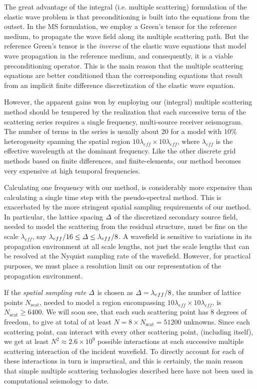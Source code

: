 The great advantage of the integral (i.e. 
multiple scattering) formulation  of the elastic wave problem is that 
preconditioning is built into the equations from the outset. In the MS 
formulation, we employ a Green's tensor for the reference medium, to 
propagate the wave field along its multiple scattering path. But the 
reference Green's tensor is the {\em inverse\/} of  the elastic wave 
equations that model wave propagation in the reference medium, and 
consequently, it is a viable preconditioning operator. This is the main 
reason that the multiple scattering equations are better conditioned than 
the corresponding equations that result from an implicit finite 
difference discretization of the elastic wave equation.



However, the apparent   gains won by employing our (integral)  multiple scattering 
method should be tempered by the 
realization that  each 
successive term of the scattering series requires a single frequency, multi-source receiver 
seismogram. The number of terms in the series is usually about $20$ for a 
model with $10\%$ heterogeneity spanning the spatial region $10 \lambda_{eff} \times  10 
\lambda_{eff}$, where $\lambda_{eff}$ is the effective wavelength at the 
dominant frequency. Like the other discrete grid methods based on finite 
differences, and finite-elements, our method becomes very expensive at 
high temporal frequencies.

Calculating one frequency with our 
method, is considerably more expensive than calculating a single time 
step with the pseudo-spectral method. This is exacerbated by the more 
stringent spatial sampling requirements of our method. In particular, the lattice spacing ${\mit 
\Delta}$ of the discretized secondary source field, needed to model the scattering from 
the residual structure, must be fine on the scale $\lambda_{eff}$, say 
$\lambda_{eff}/16 \le {\mit \Delta} \le \lambda_{eff}/8$. A wavefield is 
sensitive to variations in its propagation environment at all scale 
lengths, not just the scale lengths that can be resolved at the Nyquist 
sampling rate of the wavefield. However, for practical purposes, 
we must place a resolution limit on our 
representation of the propagation environment. 


If the {\em spatial sampling rate\/} ${\mit \Delta}$ is chosen as
${\mit \Delta}=\lambda_{eff}/8$,  the number of lattice points 
$N_{\mbox{scat}}$, needed to model a region encompassing $10 \lambda_{eff} 
\times 10 \lambda_{eff}$,  is $N_{\mbox{scat}}\ge 6400$. We will soon see, that
each such scattering point has $8$ degrees of freedom, to give at 
total
of at least $N=8\times N_{\mbox{scat}}=51200$ unknowns.
 Since each scattering point, can 
interact with every other scattering point, (including itself), we get at least 
$N^2\approx 2.6 \times 10^9$ possible interactions at
 each successive multiple scattering interaction of the incident wavefield. To directly 
account for each of these interactions in turn is impractical, and this is 
certainly, the main reason that simple multiple scattering technologies
described here have not been used in computational seismology to date.


